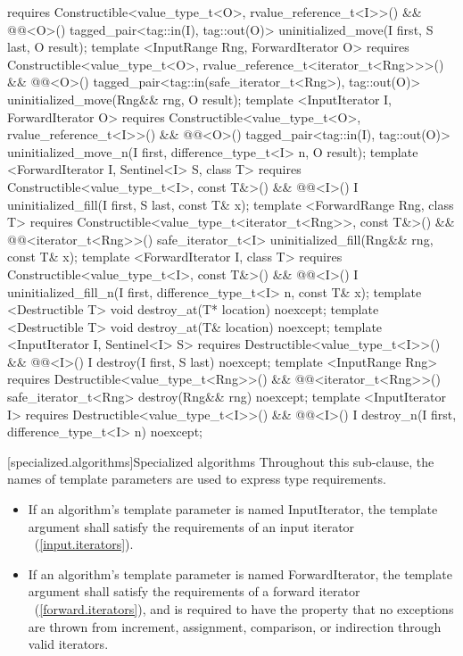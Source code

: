 {\begin{codeblock}
  requires Constructible<value_type_t<O>, rvalue_reference_t<I>>() &&
           @@<O>()
    tagged_pair<tag::in(I), tag::out(O)> uninitialized_move(I first, S last, O result);
template <InputRange Rng, ForwardIterator O>
  requires Constructible<value_type_t<O>, rvalue_reference_t<iterator_t<Rng>>>() &&
           @@<O>()
    tagged_pair<tag::in(safe_iterator_t<Rng>), tag::out(O)>
    uninitialized_move(Rng&& rng, O result);
template <InputIterator I, ForwardIterator O>
  requires Constructible<value_type_t<O>, rvalue_reference_t<I>>() &&
           @@<O>()
    tagged_pair<tag::in(I), tag::out(O)>
    uninitialized_move_n(I first, difference_type_t<I> n, O result);
template <ForwardIterator I, Sentinel<I> S, class T>
  requires Constructible<value_type_t<I>, const T&>() &&
           @@<I>()
  I uninitialized_fill(I first, S last, const T& x);
template <ForwardRange Rng, class T>
  requires Constructible<value_type_t<iterator_t<Rng>>, const T&>() &&
            @@<iterator_t<Rng>>()
  safe_iterator_t<I>
  uninitialized_fill(Rng&& rng, const T& x);
template <ForwardIterator I, class T>
  requires Constructible<value_type_t<I>, const T&>() &&
           @@<I>()
  I uninitialized_fill_n(I first, difference_type_t<I> n, const T& x);
template <Destructible T>
  void destroy_at(T* location) noexcept;
template <Destructible T>
  void destroy_at(T& location) noexcept;
template <InputIterator I, Sentinel<I> S>
  requires Destructible<value_type_t<I>>() &&
           @@<I>()
    I destroy(I first, S last) noexcept;
template <InputRange Rng>
  requires Destructible<value_type_t<Rng>>() &&
           @@<iterator_t<Rng>>()
    safe_iterator_t<Rng> destroy(Rng&& rng) noexcept;
template <InputIterator I>
  requires Destructible<value_type_t<I>>() &&
           @@<I>()
    I destroy_n(I first, difference_type_t<I> n) noexcept;
\end{codeblock}
} %

\setcounter{subsection}{9}
[specialized.algorithms]{Specialized algorithms}
\setcounter{Paras}{0}
\pnum
Throughout this sub-clause, the names of template parameters are used to express type requirements.
{\color{remclr}
\begin{itemize}
\item If an algorithm's template parameter is named InputIterator, the template argument shall satisfy the
requirements of an input iterator ~(\ref{input.iterators}).

\item If an algorithm's template parameter is named ForwardIterator, the template argument shall satisfy the
requirements of a forward iterator ~(\ref{forward.iterators}), and is required to have the property that no exceptions
are thrown from increment, assignment, comparison, or indirection through valid iterators.
\end{itemize}
} %

